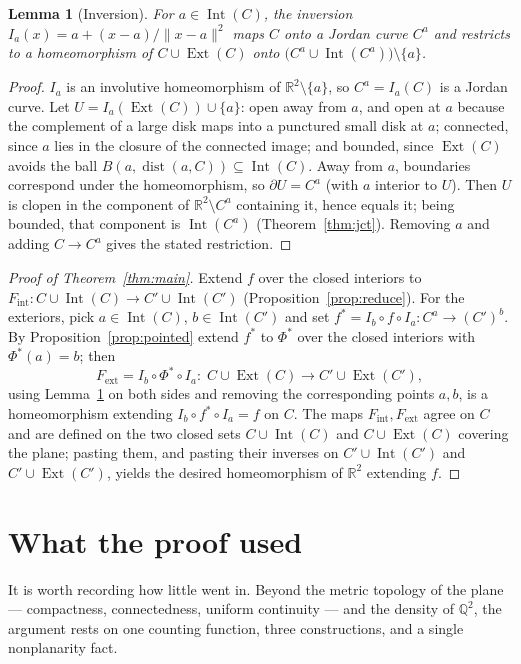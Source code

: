 \documentclass[11pt,a4paper]{article}
\theoremstyle{jsplain}
\newtheorem{lemma}[theorem]{Lemma}
\theoremstyle{jsdefn}
\newcommand{\Int}{\operatorname{Int}}
\newcommand{\Ext}{\operatorname{Ext}}
\newcommand{\dist}{\operatorname{dist}}
\begin{document}
\begin{lemma}[Inversion]\label{lem:inversion}
For $a\in\Int(C)$, the inversion $I_a(x)=a+(x-a)/\|x-a\|^2$ maps
$C$ onto a Jordan curve $C^a$ and restricts to a homeomorphism of
$C\cup\Ext(C)$ onto $\bigl(C^a\cup\Int(C^a)\bigr)\setminus\{a\}$.
\end{lemma}
\begin{proof}
$I_a$ is an involutive homeomorphism of $\mathbb R^2\setminus\{a\}$,
so $C^a=I_a(C)$ is a Jordan curve. Let
$U=I_a(\Ext(C))\cup\{a\}$: open away from $a$, and open at $a$
because the complement of a large disk maps into a punctured small
disk at $a$; connected, since $a$ lies in the closure of the connected
image; and bounded, since $\Ext(C)$ avoids the ball
$B(a,\dist(a,C))\subseteq\Int(C)$. Away from $a$, boundaries
correspond under the homeomorphism, so $\partial U=C^a$
(with $a$ interior to $U$). Then $U$ is clopen in the component of
$\mathbb R^2\setminus C^a$ containing it, hence equals it; being
bounded, that component is $\Int(C^a)$
(Theorem~\ref{thm:jct}). Removing $a$ and adding $C\to C^a$ gives the
stated restriction.
\end{proof}

\begin{proof}[Proof of Theorem~\ref{thm:main}]
Extend $f$ over the closed interiors to
$F_{\mathrm{int}}:C\cup\Int(C)\to C'\cup\Int(C')$
(Proposition~\ref{prop:reduce}). For the exteriors, pick
$a\in\Int(C)$, $b\in\Int(C')$ and set
$f^*=I_b\circ f\circ I_a:C^a\to(C')^b$. By
Proposition~\ref{prop:pointed} extend $f^*$ to
$\Phi^*$ over the closed interiors with $\Phi^*(a)=b$; then
\[
F_{\mathrm{ext}}
 =I_b\circ \Phi^*\circ I_a
 :\;C\cup\Ext(C)\longrightarrow C'\cup\Ext(C'),
\]
using Lemma~\ref{lem:inversion} on both sides and removing the
corresponding points $a,b$, is a homeomorphism extending
$I_b\circ f^*\circ I_a=f$ on $C$. The maps
$F_{\mathrm{int}},F_{\mathrm{ext}}$ agree on $C$ and are defined on
the two closed sets $C\cup\Int(C)$ and $C\cup\Ext(C)$ covering the
plane; pasting them, and pasting their inverses on
$C'\cup\Int(C')$ and $C'\cup\Ext(C')$, yields the desired
homeomorphism of $\mathbb R^2$ extending $f$.
\end{proof}

\section*{What the proof used}

It is worth recording how little went in. Beyond the metric topology of
the plane --- compactness, connectedness, uniform continuity --- and the
density of $\mathbb Q^2$, the argument rests on one counting function,
three constructions, and a single nonplanarity fact.
\end{document}
